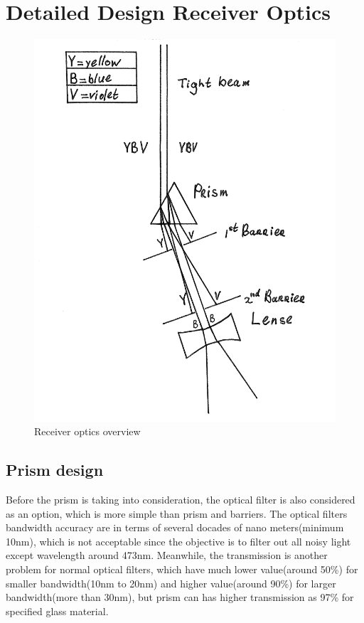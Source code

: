 \section{Detailed Design Receiver Optics}
\label{sec:DDreceiver}

\begin{figure}[ht!]
\centering
\includegraphics[scale = 0.8]{chapters/img/Prism.png}
\caption{Receiver optics overview}
\label{fig:prism}
\end{figure} 

\subsection{Prism design}
\label{prism}
Before the prism is taking into consideration, the optical filter is also considered as an option, which is more simple than prism and barriers. The optical filters bandwidth accuracy are in terms of several docades of nano meters(minimum 10nm\cite{optical_filter}), which is not acceptable since the objective is to filter out all noisy light except wavelength around 473nm. Meanwhile, the transmission is another problem for normal optical filters, which have much lower value(around 50\%) for smaller bandwidth(10nm to 20nm) and higher value(around 90\%) for larger bandwidth(more than 30nm), but prism can has higher transmission as 97\% for specified glass material.

